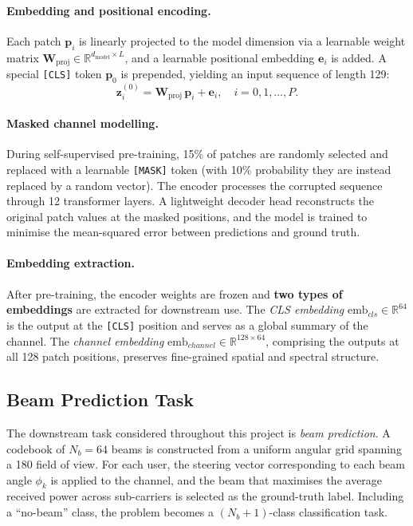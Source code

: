\documentclass[12pt,a4paper]{article}
\begin{document}
\paragraph{Embedding and positional encoding.}
Each patch $\mathbf{p}_i$ is linearly projected to the model dimension via a learnable weight matrix $\mathbf{W}_{\text{proj}}\in\mathbb{R}^{d_{\text{model}}\times L}$, and a learnable positional embedding $\mathbf{e}_i$ is added.  A special \texttt{[CLS]} token $\mathbf{p}_0$ is prepended, yielding an input sequence of length 129:
\begin{equation}
  \mathbf{z}_i^{(0)} = \mathbf{W}_{\text{proj}}\,\mathbf{p}_i + \mathbf{e}_i, \quad i=0,1,\dots,P.
  \label{eq:embed}
\end{equation}

\paragraph{Masked channel modelling.}
During self-supervised pre-training, 15\% of patches are randomly selected and replaced with a learnable \texttt{[MASK]} token (with 10\% probability they are instead replaced by a random vector).  The encoder processes the corrupted sequence through 12 transformer layers.  A lightweight decoder head reconstructs the original patch values at the masked positions, and the model is trained to minimise the mean-squared error between predictions and ground truth.

\paragraph{Embedding extraction.}
After pre-training, the encoder weights are frozen and \textbf{two types of embeddings} are extracted for downstream use.  The \emph{CLS embedding} $\mathrm{emb}_{cls}\in\mathbb{R}^{64}$ is the output at the \texttt{[CLS]} position and serves as a global summary of the channel.  The \emph{channel embedding} $\mathrm{emb}_{channel}\in\mathbb{R}^{128\times 64}$, comprising the outputs at all 128 patch positions, preserves fine-grained spatial and spectral structure.

\subsection{Beam Prediction Task}\label{subsec:beam}

The downstream task considered throughout this project is \emph{beam prediction}.  A codebook of $N_b=64$ beams is constructed from a uniform angular grid spanning a 180\textdegree{} field of view.  For each user, the steering vector corresponding to each beam angle $\phi_k$ is applied to the channel, and the beam that maximises the average received power across sub-carriers is selected as the ground-truth label.  Including a ``no-beam'' class, the problem becomes a $(N_b+1)$-class classification task.
\end{document}
